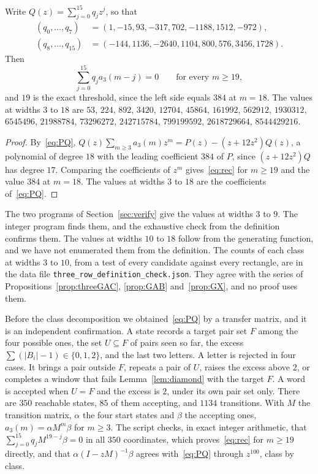 \begin{corollary}\label{cor:threerec}
Write $Q(z)=\sum_{j=0}^{15}q_jz^j$, so that
\begin{align*}
(q_0,\dots,q_7)&=(1,-15,93,-317,702,-1188,1512,-972),\\
(q_8,\dots,q_{15})&=(-144,1136,-2640,1104,800,576,3456,1728).
\end{align*}
Then
\begin{equation}\label{eq:rec}
\sum_{j=0}^{15}q_ja_3(m-j)=0\qquad\text{for every }m\ge19,
\end{equation}
and $19$ is the exact threshold, since the left side equals $384$ at $m=18$. The values at
widths $3$ to $18$ are $53$, $224$, $892$, $3420$, $12704$, $45864$, $161992$, $562912$,
$1930312$, $6545496$, $21988784$, $73296272$, $242715784$, $799199592$, $2618729664$,
$8544429216$.
\end{corollary}

\begin{proof}
By~\eqref{eq:PQ}, $Q(z)\sum_{m\ge3}a_3(m)z^m=P(z)-(z+12z^2)Q(z)$, a polynomial of degree $18$
with the leading coefficient $384$ of $P$, since $(z+12z^2)Q$ has degree $17$. Comparing the
coefficients of $z^m$ gives~\eqref{eq:rec} for $m\ge19$ and the value $384$ at $m=18$. The
values at widths $3$ to $18$ are the coefficients of~\eqref{eq:PQ}.
\end{proof}

The two programs of Section~\ref{sec:verify} give the values at widths $3$ to $9$. The
integer program finds them, and the exhaustive check from the definition confirms them. The
values at widths $10$ to $18$ follow from the generating function, and we have not enumerated
them from the definition. The counts of each class at widths $3$ to $10$, from a test of
every candidate against every rectangle, are in the data file
\texttt{three\_row\_definition\_check.json}. They agree with the series of
Propositions~\ref{prop:threeGAC}, \ref{prop:GAB} and~\ref{prop:GX}, and no proof uses them.

\begin{remark}\label{rem:transfer}
Before the class decomposition we obtained~\eqref{eq:PQ} by a transfer matrix, and it is an
independent confirmation. A state records a target pair set $F$ among the four possible ones,
the set $U\subseteq F$ of pairs seen so far, the excess $\sum(|B_i|-1)\in\{0,1,2\}$, and the
last two letters. A letter is rejected in four cases. It brings a pair outside $F$, repeats a
pair of $U$, raises the excess above $2$, or completes a window that fails
Lemma~\ref{lem:diamond} with the target $F$. A word is accepted when $U=F$ and the excess is
$2$, under its own pair set only. There are $350$ reachable states, $85$ of them accepting,
and $1134$ transitions. With $M$ the transition matrix, $\alpha$ the four start states and
$\beta$ the accepting ones, $a_3(m)=\alpha M^m\beta$ for $m\ge3$. The script checks, in exact
integer arithmetic, that $\sum_{j=0}^{15}q_jM^{19-j}\beta=0$ in all $350$ coordinates, which
proves~\eqref{eq:rec} for $m\ge19$ directly, and that $\alpha(I-zM)^{-1}\beta$
agrees with~\eqref{eq:PQ} through $z^{100}$, class by class.
\end{remark}

